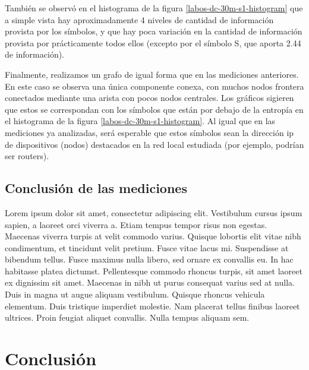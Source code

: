 \documentclass[final,inline,a4paper,narroweqnarray]{ieee}
\begin{document}
  También se observó en el histograma de la figura 
  \ref{labos-dc-30m-s1-histogram} que a simple vista hay
  aproximadamente 4 niveles de cantidad de información provista por
  los símbolos, y que hay poca variación en la cantidad de información
  provista por prácticamente todos ellos (excepto por el símbolo S,
  que aporta 2.44 de información).
  
  Finalmente, realizamos un grafo de igual forma que en las mediciones
  anteriores. En este caso se observa una única componente conexa, con
  muchos nodos frontera conectados mediante una arista con pocos nodos
  centrales. Los gráficos sigieren que estos se correspondan con los
  símbolos que están por debajo de la entropía en el histograma de la
  figura \ref{labos-dc-30m-s1-histogram}. Al igual que en las
  mediciones ya analizadas, será esperable que estos símbolos sean la
  dirección ip de dispositivos (nodos) destacados en la red local
  estudiada (por ejemplo, podrían ser routers).
  

  \subsection{Conclusión de las mediciones}

Lorem ipsum dolor sit amet, consectetur adipiscing elit. Vestibulum cursus ipsum sapien, a laoreet orci viverra a. Etiam tempus tempor risus non egestas. Maecenas viverra turpis at velit commodo varius. Quisque lobortis elit vitae nibh condimentum, et tincidunt velit pretium. Fusce vitae lacus mi. Suspendisse at bibendum tellus. Fusce maximus nulla libero, sed ornare ex convallis eu. In hac habitasse platea dictumst. Pellentesque commodo rhoncus turpis, sit amet laoreet ex dignissim sit amet. Maecenas in nibh ut purus consequat varius sed at nulla. Duis in magna ut augue aliquam vestibulum. Quisque rhoncus vehicula elementum. Duis tristique imperdiet molestie. Nam placerat tellus finibus laoreet ultrices. Proin feugiat aliquet convallis. Nulla tempus aliquam sem.

\section{Conclusión}
\end{document}
